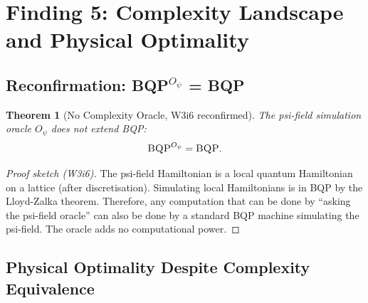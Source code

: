 \documentclass[11pt]{article}
\newtheorem{theorem}{Theorem}[section]
\theoremstyle{definition}
\theoremstyle{remark}
\newcommand{\BQP}{\textsc{BQP}}
\begin{document}
\section{Finding 5: Complexity Landscape and Physical Optimality}
\label{sec:complexity}

\subsection{Reconfirmation: BQP$^{O_\psi}$ = BQP}
\label{sec:bqp-oracle}

\begin{theorem}[No Complexity Oracle, W3i6 reconfirmed]
\label{thm:no-oracle}
The psi-field simulation oracle $O_\psi$ does not extend BQP:
\begin{equation}
  \BQP^{O_\psi} = \BQP.
  \label{eq:bqp-oracle}
\end{equation}
\end{theorem}

\begin{proof}[Proof sketch (W3i6)]
The psi-field Hamiltonian is a local quantum Hamiltonian on a lattice
(after discretisation). Simulating local Hamiltonians is in BQP by
the Lloyd-Zalka theorem. Therefore, any computation that can be done
by ``asking the psi-field oracle'' can also be done by a standard
BQP machine simulating the psi-field. The oracle adds no computational
power.
\end{proof}

\subsection{Physical Optimality Despite Complexity Equivalence}
\label{sec:physical-optimality}
\end{document}

